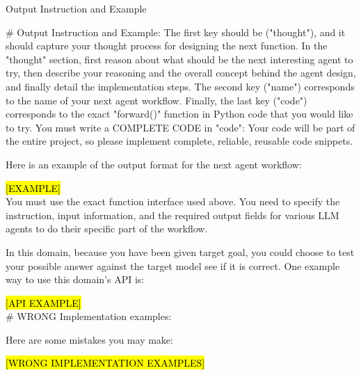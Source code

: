 \begin{mybox}{Output Instruction and Example}

\# Output Instruction and Example:
The first key should be ("thought"), and it should capture your thought process for designing the next function. In the "thought" section, first reason about what should be the next interesting agent to try, then describe your reasoning and the overall concept behind the agent design, and finally detail the implementation steps.
The second key ("name") corresponds to the name of your next agent workflow. 
Finally, the last key ("code") corresponds to the exact "forward()" function in Python code that you would like to try. You must write a COMPLETE CODE in "code": Your code will be part of the entire project, so please implement complete, reliable, reusable code snippets.

Here is an example of the output format for the next agent workflow:

\hl{[EXAMPLE]} \\

You must use the exact function interface used above. You need to specify the instruction, input information, and the required output fields for various LLM agents to do their specific part of the workflow. 

In this domain, because you have been given target goal, you could choose to test your possible answer against the target model see if it is correct. One example way to use this domain's API is:

\hl{[API EXAMPLE]} \\



\# WRONG Implementation examples:

Here are some mistakes you may make:

\hl{[WRONG IMPLEMENTATION EXAMPLES]} \\


\end{mybox}
